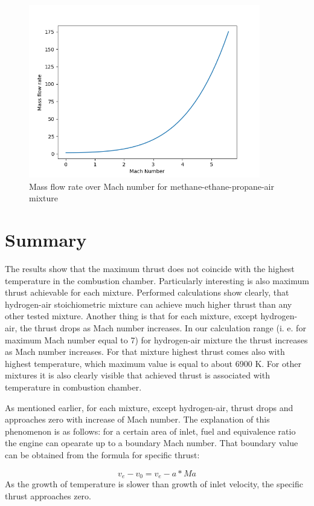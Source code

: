 \documentclass[a4paper,11pt]{article}
\begin{document}
	\begin{figure}[H]
		\centering
		\includegraphics[width=0.9\textwidth]{Metan(1mol)_etan(0.4mol)_propan(0.2mol)_pow/Mass_flow_rate_over_Mach.png}
       		\caption{Mass flow rate over Mach number for methane-ethane-propane-air mixture}
	\end{figure}

\section{Summary}

The results show that the maximum thrust does not coincide with the highest temperature in the combustion chamber. Particularly interesting is also maximum thrust achievable for each mixture. Performed calculations show clearly, that hydrogen-air stoichiometric mixture can achieve much higher thrust than any other tested mixture. Another thing is that for each mixture, except hydrogen-air, the thrust drops as Mach number increases. In our calculation range (i. e. for maximum Mach number equal to 7) for hydrogen-air mixture the thrust increases as Mach number increases. For that mixture highest thrust comes also with highest temperature, which maximum value is equal to about 6900 K. For other mixtures it is also clearly visible that achieved thrust is associated with temperature in combustion chamber.

As mentioned earlier, for each mixture, except hydrogen-air, thrust drops and approaches zero with increase of Mach number. The explanation of this phenomenon is as follows: for a certain area of inlet, fuel and equivalence ratio the engine can opearate up to a boundary Mach number. That boundary value can be obtained from the formula for specific thrust:

$$v_e-v_0=v_e-a*Ma$$
As the growth of temperature is slower than growth of inlet velocity, the specific thrust approaches zero.
\end{document}
